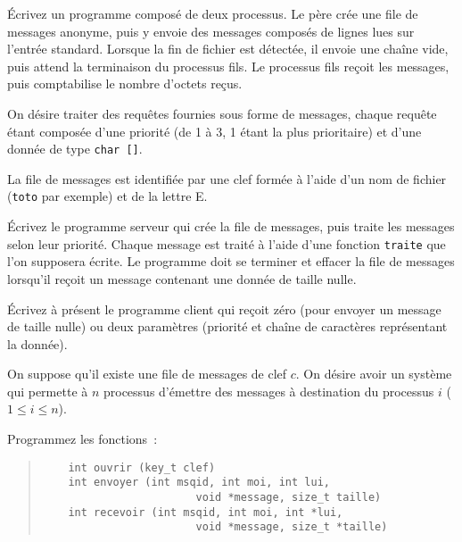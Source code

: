 %


% 


\question

Écrivez un programme composé de deux processus. Le père crée
une file de messages anonyme, puis y envoie des messages composés
de lignes lues sur l'entrée standard. Lorsque la fin de fichier
est détectée, il envoie une chaîne vide, puis attend la terminaison
du processus fils. Le processus fils reçoit les messages, puis
comptabilise le nombre d'octets reçus.


\question

On désire traiter des requêtes fournies sous forme de messages, chaque
requête étant composée d'une priorité (de 1 à 3, 1 étant la plus
prioritaire) et d'une donnée de type \verb|char []|.

La file de messages est identifiée par une clef formée à l'aide d'un nom
de fichier ({\tt toto} par exemple) et de la lettre E.

Écrivez le programme serveur qui crée la file de messages, puis traite
les messages selon leur priorité.  Chaque message est traité à l'aide
d'une fonction {\tt traite} que l'on supposera écrite.  Le programme
doit se terminer et effacer la file de messages lorsqu'il reçoit un
message contenant une donnée de taille nulle.

Écrivez à présent le programme client qui reçoit zéro (pour envoyer un
message de taille nulle) ou deux paramètres (priorité et chaîne de
caractères représentant la donnée).


\question

On suppose qu'il existe une file de messages de clef $c$. On désire
avoir un système qui permette à $n$ processus d'émettre des messages à
destination du processus $i$ ($1 \leq i \leq n$).

Programmez les fonctions~:

\begin {quote}
\begin {verbatim}
    int ouvrir (key_t clef)
    int envoyer (int msqid, int moi, int lui,
                        void *message, size_t taille)
    int recevoir (int msqid, int moi, int *lui,
                        void *message, size_t *taille)
\end{verbatim}
\end {quote}

